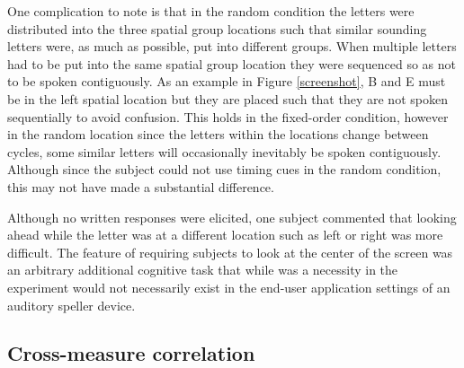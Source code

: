 \documentclass[10pt]{article}
\begin{document}
One complication to note is that in the random condition the
letters were distributed into the three spatial group
locations such that similar sounding letters were, as much as
possible, put into different groups. When multiple letters had
to be put into the same spatial group location they were
sequenced so as not to be spoken contiguously.  As an example
in Figure \ref{screenshot}, B and E must be in the left
spatial location but they are placed such that they are not
spoken sequentially to avoid confusion.  This holds in the
fixed-order condition, however in the random location since
the letters within the locations change between cycles, some
similar letters will occasionally inevitably be spoken contiguously.
Although since the subject could not use timing cues in the
random condition, this may not have made a substantial
difference. 


Although no written responses were elicited, one subject commented that looking ahead while the letter was at a
different location such as left or right was more difficult.  The
feature of requiring subjects to look at the center of the screen
was an arbitrary additional cognitive task that while
was a necessity in the experiment would not necessarily exist in the
end-user application settings of an auditory speller device.

\subsection{Cross-measure correlation}
\end{document}
